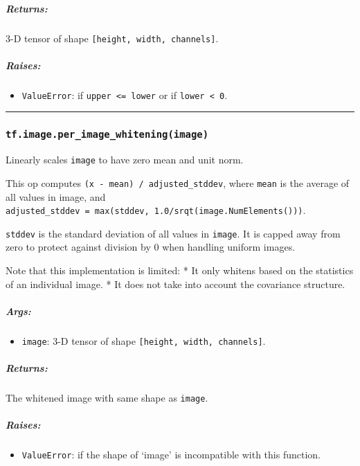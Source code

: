 \subparagraph{Returns: }\label{returns-22}

3-D tensor of shape \texttt{{[}height,\ width,\ channels{]}}.

\subparagraph{Raises: }\label{raises-11}

\begin{itemize}
\tightlist
\item
  \texttt{ValueError}: if \texttt{upper\ \textless{}=\ lower} or if
  \texttt{lower\ \textless{}\ 0}.
\end{itemize}

\begin{center}\rule{0.5\linewidth}{\linethickness}\end{center}

\subsubsection{\texorpdfstring{\texttt{tf.image.per\_image\_whitening(image)}
}{tf.image.per\_image\_whitening(image) }}\label{tf.image.perux5fimageux5fwhiteningimage}

Linearly scales \texttt{image} to have zero mean and unit norm.

This op computes \texttt{(x\ -\ mean)\ /\ adjusted\_stddev}, where
\texttt{mean} is the average of all values in image, and
\texttt{adjusted\_stddev\ =\ max(stddev,\ 1.0/srqt(image.NumElements()))}.

\texttt{stddev} is the standard deviation of all values in
\texttt{image}. It is capped away from zero to protect against division
by 0 when handling uniform images.

Note that this implementation is limited: * It only whitens based on the
statistics of an individual image. * It does not take into account the
covariance structure.

\subparagraph{Args: }\label{args-23}

\begin{itemize}
\tightlist
\item
  \texttt{image}: 3-D tensor of shape
  \texttt{{[}height,\ width,\ channels{]}}.
\end{itemize}

\subparagraph{Returns: }\label{returns-23}

The whitened image with same shape as \texttt{image}.

\subparagraph{Raises: }\label{raises-12}

\begin{itemize}
\tightlist
\item
  \texttt{ValueError}: if the shape of `image' is incompatible with this
  function.
\end{itemize}


